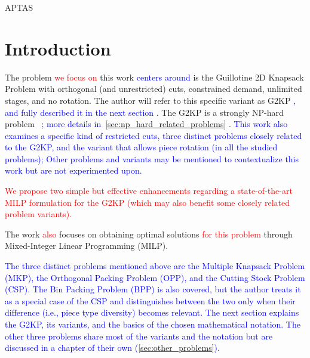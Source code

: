 \documentclass[ppgc,tese,english,formais,babel]{iiufrgs}
\newif\iffinalversion
\newcommand{\newtext}[1]{\iffinalversion%
#1%
\else%
\textcolor{blue}{#1}%
\fi%
}
\newcommand{\oldtext}[1]{\iffinalversion%
\else%
\textcolor{red}{#1}%
\fi%
}
\begin{document}
\listoftables

\begin{listofabbrv}{APTAS}

\end{listofabbrv}


\tableofcontents


\chapter{Introduction}

The problem \oldtext{we focus on} this work \newtext{centers around} is the Guillotine 2D Knapsack Problem with orthogonal (and unrestricted) cuts, constrained demand, unlimited stages, and no rotation.
The author will refer to this specific variant as G2KP\newtext{, and fully described it in the next section}.
The G2KP is a strongly NP-hard problem~\newtext{\citep{korf:initial:2003,dolatabadi:2012}; more details in~\cref{sec:np_hard_related_problems}}.
\newtext{This work also examines a specific kind of restricted cuts, three distinct problems closely related to the G2KP, and the variant that allows piece rotation (in all the studied problems); Other problems and variants may be mentioned to contextualize this work but are not experimented upon.}
\oldtext{We propose two simple but effective enhancements regarding a state-of-the-art MILP formulation for the G2KP (which may also benefit some closely related problem variants).}
The work \oldtext{also} focuses on obtaining optimal solutions \oldtext{for this problem} through Mixed-Integer Linear Programming (MILP).

\newtext{
The three distinct problems mentioned above are the Multiple Knapsack Problem (MKP), the Orthogonal Packing Problem (OPP), and the Cutting Stock Problem (CSP). The Bin Packing Problem (BPP) is also covered, but the author treats it as a special case of the CSP and distinguishes between the two only when their difference (i.e., piece type diversity) becomes relevant.
The next section explains the G2KP, its variants, and the basics of the chosen mathematical notation.
The other three problems share most of the variants and the notation but are discussed in a chapter of their own (\cref{sec:other_problems}).
}
\end{document}
